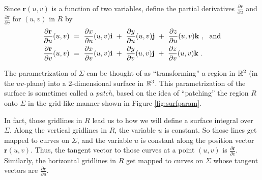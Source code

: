 Since $\mathbf{r}(u,v)$ is a function of two variables, define the partial derivatives
$\frac{\partial \mathbf{r}}{\partial u}$ and $\frac{\partial \mathbf{r}}{\partial v}$ for $(u,v)$ in $R$ by
\begin{align*}
 \frac{\partial \mathbf{r}}{\partial u}(u,v) ~&=~
 \frac{\partial x}{\partial u}(u,v) \mathbf{i} ~+~ \frac{\partial y}{\partial u}(u,v) \mathbf{j} ~+~
 \frac{\partial z}{\partial u}(u,v) \mathbf{k} ~,~~\text{and}\smallskip\\
 \frac{\partial \mathbf{r}}{\partial v}(u,v) ~&=~
 \frac{\partial x}{\partial v}(u,v) \mathbf{i} ~+~ \frac{\partial y}{\partial v}(u,v) \mathbf{j} ~+~
 \frac{\partial z}{\partial v}(u,v) \mathbf{k} ~.
\end{align*}

The parametrization of $\Sigma$ can be thought of as ``transforming'' a region in $\mathbb{R}^{2}$ (in the $uv$-plane) into
a 2-dimensional surface in $\mathbb{R}^{3}$. This parametrization of the surface is sometimes called a \emph{patch}, based
on the idea of ``patching'' the region $R$ onto $\Sigma$ in the grid-like manner shown in Figure \ref{fig:surfparam}.

In fact, those gridlines in $R$ lead us to how we will define a surface integral over $\Sigma$. Along the
vertical gridlines in $R$, the variable $u$ is constant. So those lines get mapped to curves on $\Sigma$, and the
variable $u$ is constant along the position vector $\mathbf{r}(u,v)$. Thus, the tangent vector to those curves at a
point $(u,v)$ is $\frac{\partial \mathbf{r}}{\partial v}$. Similarly, the horizontal gridlines in $R$ get mapped to
curves on $\Sigma$ whose tangent vectors are $\frac{\partial \mathbf{r}}{\partial u}$.

